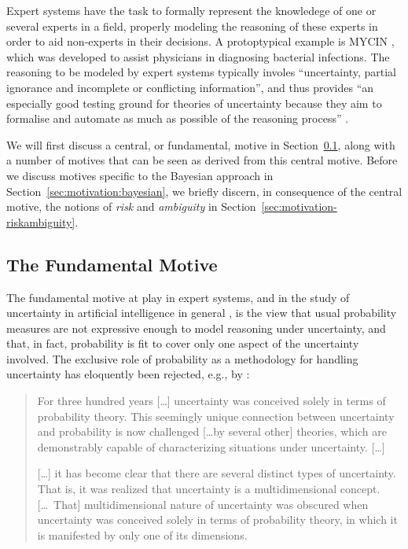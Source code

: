 Expert systems have the task to formally represent the knowledege of one or several experts in a field,
properly modeling the reasoning of these experts in order to aid non-experts in their decisions.
A protoptypical example is MYCIN \parencite{1976:shortliffe},
which was developed to assist physicians in diagnosing bacterial infections.
The reasoning to be modeled by expert systems typically involes
``uncertainty, partial ignorance and incomplete or conflicting information'', and thus provides
``an especially good testing ground for theories of uncertainty
because they aim to formalise and automate as much as possible
of the reasoning process'' \parencite[p.~2]{1996:walley::expert}.

We will first discuss a central, or fundamental, motive in Section~\ref{sec:motivation-fundamental},
along with a number of motives that can be seen as derived from this central motive.
Before we discuss motives specific to the Bayesian approach in Section~\ref{sec:motivation:bayesian},
we briefly discern, in consequence of the central motive, the notions of \emph{risk} and \emph{ambiguity}
in Section~\ref{sec:motivation-riskambiguity}.

\subsection{The Fundamental Motive}
\label{sec:motivation-fundamental}

The fundamental motive at play in expert systems,
and in the study of uncertainty in artificial intelligence in general \parencite[see, e.g.,][]{2006:lawry},
is the view that usual probability measures
are not expressive enough to model reasoning under uncertainty,
and that, in fact, probability is fit to cover only one aspect of the uncertainty involved.
The exclusive role of probability as a methodology for handling uncertainty has eloquently been rejected,
e.g., by \textcite[p.~1]{1999:klir}: 
\begin{quotation}
\begin{small}
For three hundred years [\ldots] uncertainty was conceived solely in
terms of probability theory. This seemingly unique connection
between uncertainty and probability is now challenged [\ldots by several
other] theories, which are demonstrably capable of characterizing
situations under uncertainty. [\ldots]

[\ldots] it has become clear that there are several distinct types of
uncertainty. That is, it was realized that uncertainty is a
multidimensional concept. [\ldots\ That] multidimensional nature of
uncertainty was obscured when uncertainty was conceived solely in
terms of probability theory, in which it is manifested by only one
of its dimensions.
\end{small}
\end{quotation}

